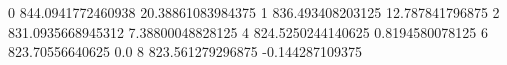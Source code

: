 0 844.0941772460938 20.38861083984375
1 836.493408203125 12.787841796875
2 831.0935668945312 7.38800048828125
4 824.5250244140625 0.8194580078125
6 823.70556640625 0.0
8 823.561279296875 -0.144287109375
